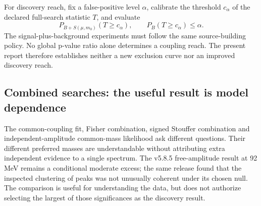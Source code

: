 For discovery reach, fix a false-positive level $\alpha$, calibrate the threshold $c_\alpha$ of the declared full-search statistic $T$, and evaluate
\[
 P_{B+S(\mu,m_0)}\!\left(T\geq c_\alpha\right),
 \qquad P_B(T\geq c_\alpha)\leq\alpha.
\]
The signal-plus-background experiments must follow the same source-building policy. No global p-value ratio alone determines a coupling reach. The present report therefore establishes neither a new exclusion curve nor an improved discovery reach.

\subsection{Combined searches: the useful result is model dependence}
The common-coupling fit, Fisher combination, signed Stouffer combination and independent-amplitude common-mass likelihood ask different questions. Their different preferred masses are understandable without attributing extra independent evidence to a single spectrum. The v5.8.5 free-amplitude result at 92 MeV remains a conditional moderate excess; the same release found that the inspected clustering of peaks was not unusually coherent under its chosen null. The comparison is useful for understanding the data, but does not authorize selecting the largest of those significances as the discovery result.
